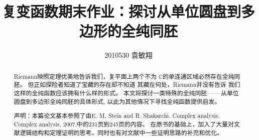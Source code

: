 \documentclass[UTF8]{ctexart}[a4paper,10pt]
\title{复变函数\uppercase\expandafter{\romannumeral2}期末作业：探讨从单位圆盘到多边形的全纯同胚}
\author{2010530 袁敏翔}
\begin{document}
    \maketitle
    
    \begin{abstract}
        Riemann映照定理优美地告诉我们，复平面上两个不为
        $\mathbb{C}$的单连通区域必然存在全纯同胚。
        但正如探险者知道了宝藏的存在却不知道
        其藏在何处，Riemann并没有告诉
        我们这样的全纯函数应该拥有什么样的形式。
        本文将探讨一类特殊的全纯同胚——
        从单位圆盘到多边形全纯同胚的具体形式,
        以此为其他情况下寻找全纯函数提供启发。

        声明：本篇论文基本参照了由E. M. Stein and R. Shakarchi. Complex analysis. Complex analysis, 2007.中的231页到245页的内容。
        在原书的基础上，加入了大量对文献逻辑结构和定理证明的思考。同时也有对文献中一些证明思路的补充和优化。
    \end{abstract}
    \tableofcontents
    
    \newpage
\end{document}
